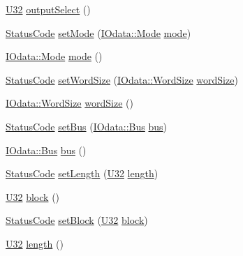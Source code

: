 \begin{DoxyCompactItemize}
\item 
\hyperlink{classIOdata_a96fb57f5fcd87b708743abd3c86a5198}{U32} \hyperlink{classIOdata_aaa410b57a4607857d45ac6a7cd013307}{output\+Select} ()
\item 
\hyperlink{classStatusCode}{Status\+Code} \hyperlink{classIOdata_ad81e9fd3f2cd9dcaffd9eabddf8f867e}{set\+Mode} (\hyperlink{classIOdata_a044e9a4a0c6d25a43ebfe29c4fa4f1e5}{I\+Odata\+::\+Mode} \hyperlink{classIOdata_aae2073c3bc6bc9f620dc0fca7fccc9a7}{mode})
\item 
\hyperlink{classIOdata_a044e9a4a0c6d25a43ebfe29c4fa4f1e5}{I\+Odata\+::\+Mode} \hyperlink{classIOdata_aae2073c3bc6bc9f620dc0fca7fccc9a7}{mode} ()
\item 
\hyperlink{classStatusCode}{Status\+Code} \hyperlink{classIOdata_a20f30a9f4673713616447b1b5e9817d5}{set\+Word\+Size} (\hyperlink{classIOdata_a37c53ebf4bf8d866aac8af572962a84c}{I\+Odata\+::\+Word\+Size} \hyperlink{classIOdata_a91f9e8b4095ca8365a824e43be36b143}{word\+Size})
\item 
\hyperlink{classIOdata_a37c53ebf4bf8d866aac8af572962a84c}{I\+Odata\+::\+Word\+Size} \hyperlink{classIOdata_a91f9e8b4095ca8365a824e43be36b143}{word\+Size} ()
\item 
\hyperlink{classStatusCode}{Status\+Code} \hyperlink{classIOdata_aca154b90e490608b5b5c0ead58e1fafc}{set\+Bus} (\hyperlink{classIOdata_a99aa7bed39364c4359ab8a7596bc013c}{I\+Odata\+::\+Bus} \hyperlink{classIOdata_ab904bcca0e8e3bebc3299e47ca93a8a1}{bus})
\item 
\hyperlink{classIOdata_a99aa7bed39364c4359ab8a7596bc013c}{I\+Odata\+::\+Bus} \hyperlink{classIOdata_ab904bcca0e8e3bebc3299e47ca93a8a1}{bus} ()
\item 
\hyperlink{classStatusCode}{Status\+Code} \hyperlink{classIOdata_affaf98e7f9e596263e914b055f8f93c2}{set\+Length} (\hyperlink{classIOdata_a96fb57f5fcd87b708743abd3c86a5198}{U32} \hyperlink{classIOdata_abb40e71ce0290832a24857b4a1e7b1a3}{length})
\item 
\hyperlink{classIOdata_a96fb57f5fcd87b708743abd3c86a5198}{U32} \hyperlink{classIOdata_aeda27840c9a9b7b3b86efc71c56cd868}{block} ()
\item 
\hyperlink{classStatusCode}{Status\+Code} \hyperlink{classIOdata_a334f07d85e3dc8069551dcd8ab942e9c}{set\+Block} (\hyperlink{classIOdata_a96fb57f5fcd87b708743abd3c86a5198}{U32} \hyperlink{classIOdata_aeda27840c9a9b7b3b86efc71c56cd868}{block})
\item 
\hyperlink{classIOdata_a96fb57f5fcd87b708743abd3c86a5198}{U32} \hyperlink{classIOdata_abb40e71ce0290832a24857b4a1e7b1a3}{length} ()

\end{DoxyCompactItemize}
